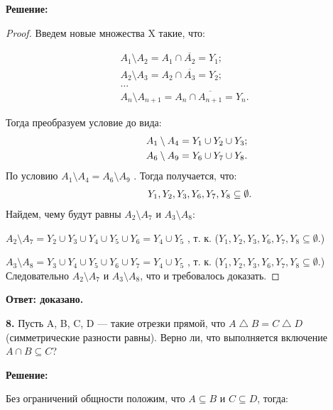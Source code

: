 \documentclass[a4paper,12pt]{article} %
\begin{document}
\begin{center}
\bfseries
{\Large Решение: }
\end{center}
\begin{proof}
Введем новые множества X такие, что:

\begin{align}
A_{1}\setminus A_{2} = A_{1}\cap \overline{A_{2}} = Y_{1};\\
A_{2}\setminus A_{3} = A_{2}\cap \overline{A_{3}} = Y_{2};\\
\dots\\
A_{n}\setminus A_{n+1} = A_{n}\cap \overline{A_{n+1}} = Y_{n}.
\end{align}

Тогда преобразуем условие до вида:
\begin{align}
\hspace{9mm} A_{1}\setminus A_{4} = Y_{1} \cup Y_{2} \cup Y_{3};\\
\hspace{9mm} A_{6}\setminus A_{9} = Y_{6} \cup Y_{7} \cup Y_{8}.
\end{align}
По условию $A_{1}\setminus A_{4} = A_{6}\setminus A_{9}$ . Тогда получается, что:
\begin{align}
\hspace{11mm} Y_{1}, Y_{2}, Y_{3} ,Y_{6}, Y_{7} ,Y_{8} \subseteq  \emptyset.
\end{align}
Найдем, чему будут равны $A_{2} \setminus A_{7} $ и $ A_{3} \setminus A_{8}$:

$A_{2} \setminus A_{7} = Y_{2}\cup Y_{3}\cup Y_{4}\cup Y_{5}\cup Y_{6} = Y_{4}\cup Y_{5}$ , т. к. ($ Y_{1}, Y_{2}, Y_{3} ,Y_{6}, Y_{7} ,Y_{8} \subseteq  \emptyset.$)

$ A_{3} \setminus A_{8} = Y_{3}\cup Y_{4}\cup Y_{5}\cup Y_{6}\cup Y_{7} = Y_{4}\cup Y_{5}$ , т. к. ($ Y_{1}, Y_{2}, Y_{3} ,Y_{6}, Y_{7} ,Y_{8} \subseteq  \emptyset.$)\\
Следовательно $A_{2} \setminus A_{7} $ и $ A_{3} \setminus A_{8}$, что и требовалось доказать.
\end{proof}

\begin{flushright}
\begin{large}
\textbf {Ответ: доказано.}
\end{large}
\end{flushright}


{\bf 8.} Пусть A, B, C, D — такие отрезки прямой, что $A \bigtriangleup B = C \bigtriangleup D$ (симметрические разности равны). Верно ли, что выполняется включение $A \cap B \subseteq C$?
\newpage
\begin{center}
\bfseries
{\Large Решение: }
\end{center}
Без ограничений общности положим, что $A \subseteq B$ и $C \subseteq D$, тогда:
\end{document}
